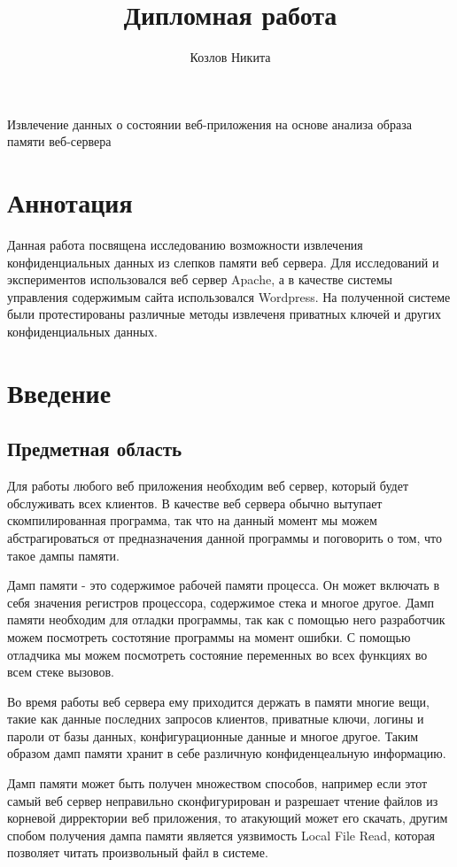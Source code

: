 \documentclass[20pt]{article}
\title{Дипломная работа}
\author{Козлов Никита}
\begin{document}
{\huge Извлечение данных о состоянии веб-приложения на основе анализа образа памяти веб-сервера}

\newpage

\section*{Аннотация}
Данная работа посвящена исследованию возможности извлечения конфиденциальных данных из слепков памяти веб сервера. Для исследований и экспериментов использовался веб сервер Apache, а в качестве системы управления содержимым сайта использовался Wordpress. На полученной системе были протестированы
различные методы извлеченя приватных ключей и других конфиденциальных данных.

\newpage

\tableofcontents

\newpage

\section{Введение}

\subsection{Предметная область}
Для работы любого веб приложения необходим веб сервер, который будет обслуживать
всех клиентов. В качестве веб сервера обычно вытупает скомпилированная программа,
так что на данный момент мы можем абстрагироваться от предназначения данной
программы и поговорить о том, что такое дампы памяти.

Дамп памяти - это содержимое рабочей памяти процесса. Он может включать в себя
значения регистров процессора, содержимое стека и многое другое.
Дамп памяти необходим для отладки программы, так как с помощью него разработчик
можем посмотреть состотяние программы на момент ошибки.
С помощью отладчика мы можем посмотреть состояние переменных во всех функциях во
всем стеке вызовов.

Во время работы веб сервера ему приходится держать в памяти многие вещи, такие
как данные последних запросов клиентов, приватные ключи, логины
и пароли от базы данных, конфигурационные данные и многое другое. Таким образом
дамп памяти хранит в себе различную конфиденцеальную информацию.

Дамп памяти может быть получен множеством способов, например если этот самый веб
сервер неправильно сконфигурирован и разрешает чтение файлов из корневой
дирректории веб приложения, то атакующий может его скачать, другим спобом
получения дампа памяти является уязвимость Local File Read, которая позволяет
читать произвольный файл в системе.
\end{document}
